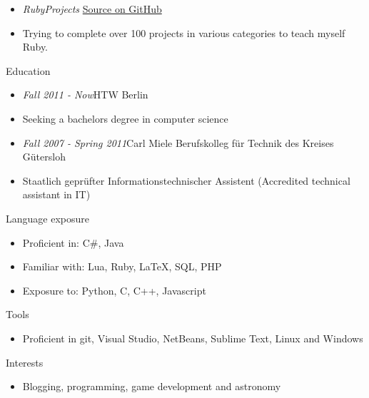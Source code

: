 \documentclass[12pt]{article}
\begin{document}
\begin{itemize}
  \setlength{\itemsep}{0cm}
  \setlength{\parskip}{0cm}
  \item[] \emph{RubyProjects} \hfill \href{https://github.com/phansch/Projects}{Source on GitHub}

  \item[] Trying to complete over 100 projects in various categories to teach myself Ruby.

\end{itemize}

\vspace{0.5cm}
\textcolor{RedOrange}{\Large Education}

\begin{itemize}
  \setlength{\itemsep}{0cm}
  \setlength{\parskip}{0cm}
  \item[] \emph{Fall 2011 - Now}\hfill HTW Berlin
  \item[] Seeking a bachelors degree in computer science
\end{itemize}

\begin{itemize}
  \setlength{\itemsep}{0cm}
  \setlength{\parskip}{0cm}
  \item[] \emph{Fall 2007 - Spring 2011}\hfill Carl Miele Berufskolleg für Technik des Kreises Gütersloh
  \item[] Staatlich geprüfter Informationstechnischer Assistent (Accredited technical assistant in IT)
\end{itemize}

\vspace{0.5cm}
\textcolor{RedOrange}{\Large Language exposure}
\begin{itemize}
  \setlength{\itemsep}{0cm}
  \setlength{\parskip}{0cm}
  \item[] Proficient in: C\#, Java
  \item[] Familiar with: Lua, Ruby, LaTeX, SQL, PHP
  \item[] Exposure to: Python, C, C++, Javascript
\end{itemize}

\vspace{0.5cm}
\textcolor{RedOrange}{\Large Tools}
\begin{itemize}
  \setlength{\itemsep}{0cm}
  \setlength{\parskip}{0cm}
  \item[] Proficient in git, Visual Studio, NetBeans, Sublime Text, Linux and Windows
\end{itemize}

\vspace{0.5cm}
\textcolor{RedOrange}{\Large Interests}
\begin{itemize}
  \setlength{\itemsep}{0cm}
  \setlength{\parskip}{0cm}
  \item[] Blogging, programming, game development and astronomy
\end{itemize}
\end{document}
